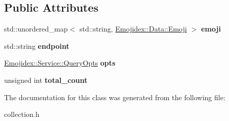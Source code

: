 \subsection*{Public Attributes}
\begin{DoxyCompactItemize}
\item 
std\+::unordered\+\_\+map$<$ std\+::string, \hyperlink{classEmojidex_1_1Data_1_1Emoji}{Emojidex\+::\+Data\+::\+Emoji} $>$ {\bfseries emoji}\hypertarget{classEmojidex_1_1Data_1_1Collection_aa8164e800401e64ce162ee5e734d9e74}{}\label{classEmojidex_1_1Data_1_1Collection_aa8164e800401e64ce162ee5e734d9e74}

\item 
std\+::string {\bfseries endpoint}\hypertarget{classEmojidex_1_1Data_1_1Collection_a937eedb36767877da7c793625bf919a6}{}\label{classEmojidex_1_1Data_1_1Collection_a937eedb36767877da7c793625bf919a6}

\item 
\hyperlink{classEmojidex_1_1Service_1_1QueryOpts}{Emojidex\+::\+Service\+::\+Query\+Opts} {\bfseries opts}\hypertarget{classEmojidex_1_1Data_1_1Collection_ade67a564b14f14375af66bc1a550ecdb}{}\label{classEmojidex_1_1Data_1_1Collection_ade67a564b14f14375af66bc1a550ecdb}

\item 
unsigned int {\bfseries total\+\_\+count}\hypertarget{classEmojidex_1_1Data_1_1Collection_a0355662d1097dd631a6d6ce09875e8c3}{}\label{classEmojidex_1_1Data_1_1Collection_a0355662d1097dd631a6d6ce09875e8c3}

\end{DoxyCompactItemize}


The documentation for this class was generated from the following file\+:\begin{DoxyCompactItemize}
\item 
collection.\+h\end{DoxyCompactItemize}
